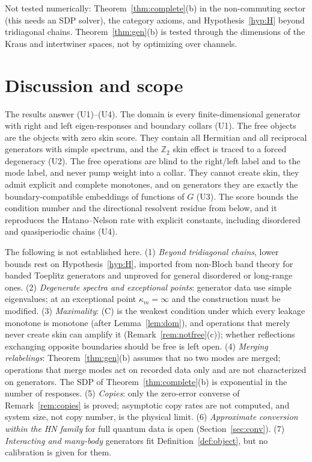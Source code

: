 \documentclass[11pt]{article}
\theoremstyle{definition}
\theoremstyle{remark}
\begin{document}
Not tested numerically: Theorem~\ref{thm:complete}(b) in the non-commuting sector (this needs an SDP solver), the category axioms, and Hypothesis~\ref{hyp:H} beyond tridiagonal chains. Theorem~\ref{thm:gen}(b) is tested through the dimensions of the Kraus and intertwiner spaces, not by optimizing over channels.

\section{Discussion and scope}
\label{sec:disc}

The results answer (U1)--(U4). The domain is every finite-dimensional generator with right and left eigen-responses and boundary collars (U1). The free objects are the objects with zero skin score. They contain all Hermitian and all reciprocal generators with simple spectrum, and the $\mathbb Z_2$ skin effect is traced to a forced degeneracy (U2). The free operations are blind to the right/left label and to the mode label, and never pump weight into a collar. They cannot create skin, they admit explicit and complete monotones, and on generators they are exactly the boundary-compatible embeddings of functions of $G$ (U3). The score bounds the condition number and the directional resolvent residue from below, and it reproduces the Hatano--Nelson rate with explicit constants, including disordered and quasiperiodic chains (U4).

The following is not established here.
(1) \emph{Beyond tridiagonal chains}, lower bounds rest on Hypothesis~\ref{hyp:H}, imported from non-Bloch band theory for banded Toeplitz generators and unproved for general disordered or long-range ones.
(2) \emph{Degenerate spectra and exceptional points}: generator data use simple eigenvalues; at an exceptional point $\kappa_m=\infty$ and the construction must be modified.
(3) \emph{Maximality}: (C) is the weakest condition under which every leakage monotone is monotone (after Lemma~\ref{lem:dom}), and operations that merely never create skin can amplify it (Remark~\ref{rem:notfree}(c)); whether reflections exchanging opposite boundaries should be free is left open.
(4) \emph{Merging relabelings}: Theorem~\ref{thm:gen}(b) assumes that no two modes are merged; operations that merge modes act on recorded data only and are not characterized on generators. The SDP of Theorem~\ref{thm:complete}(b) is exponential in the number of responses.
(5) \emph{Copies}: only the zero-error converse of Remark~\ref{rem:copies} is proved; asymptotic copy rates are not computed, and system size, not copy number, is the physical limit.
(6) \emph{Approximate conversion within the HN family} for full quantum data is open (Section~\ref{sec:conv}).
(7) \emph{Interacting and many-body} generators fit Definition~\ref{def:object}, but no calibration is given for them.
\end{document}
